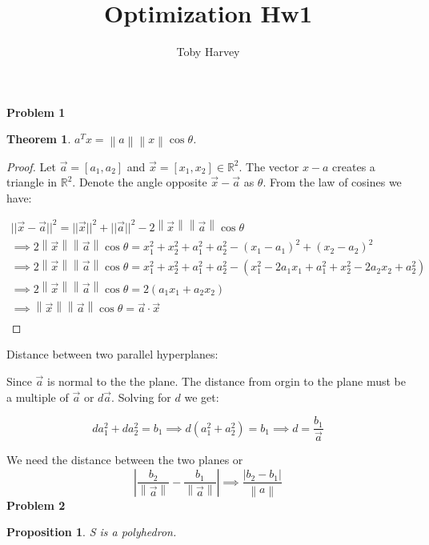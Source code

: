 \documentclass{article}
\newcommand{\norm}[1]{\left\lVert#1\right\rVert}
\newtheorem{theorem}{Theorem}
\newtheorem{prop}{Proposition}
\begin{document}
\title{Optimization Hw1}
\author{Toby Harvey}
\maketitle
\noindent\textbf{Problem 1}


\vspace{5mm}

\begin{theorem}
$a^Tx = \norm{a} \norm{x} \cos \theta$.
\end{theorem}

\begin{proof}
  
Let $\vec{a} = [a_1, a_2]$ and $\vec{x} = [x_1, x_2] \in \mathbb{R}^2$. The vector $x-a$ creates a triangle in $\mathbb{R}^2$.
Denote the angle opposite $\vec{x}-\vec{a}$ as $\theta$. From the law of cosines we have:

\begin{gather*}
||\vec{x}-\vec{a}||^2 = ||\vec{x}||^2 + ||\vec{a}||^2 -2\norm{\vec{x}} \norm{\vec{a}}\cos \theta \\
\implies 2\norm{\vec{x}} \norm{\vec{a}}\cos \theta = x_1^2 + x_2^2 +a_1^2 + a_2^2 - (x_1-a_1)^2 + (x_2-a_2)^2 \\
\implies 2\norm{\vec{x}} \norm{\vec{a}}\cos \theta  = x_1^2 + x_2^2 +a_1^2 + a_2^2 - (x_1^2-2a_1x_1 + a_1^2 + x_2^2 -2a_2x_2 + a_2^2) \\
\implies 2\norm{\vec{x}} \norm{\vec{a}}\cos \theta  = 2(a_1x_1 + a_2x_2) \\
\implies \norm{\vec{x}} \norm{\vec{a}}\cos \theta = \vec{a} \cdot \vec{x} \\
\end{gather*}

\end{proof}

\vspace{5mm}

\noindent Distance between two parallel hyperplanes:

\noindent Since $\vec{a}$ is normal to the the plane. The distance from orgin to the plane must be a multiple of $\vec{a}$ or  $d\vec{a}$. Solving for $d$ we get:

$$d a_1^2 + d a_2^2 = b_1 \implies
d ( a_1^2 + a_2^2) = b_1 \implies
d =\frac{b_1}{\vec{a}}$$

We need the distance between the two planes or
$$|\frac{b_2}{\norm{\vec{a}}} - \frac{b_1}{\norm{\vec{a}}}| \implies
\frac{|b_2 - b_1|}{\norm{a}}$$
\newpage
\noindent\textbf{Problem 2}
\vspace{5mm}
\begin{prop}
S is a polyhedron.
\end{prop}
\end{document}
